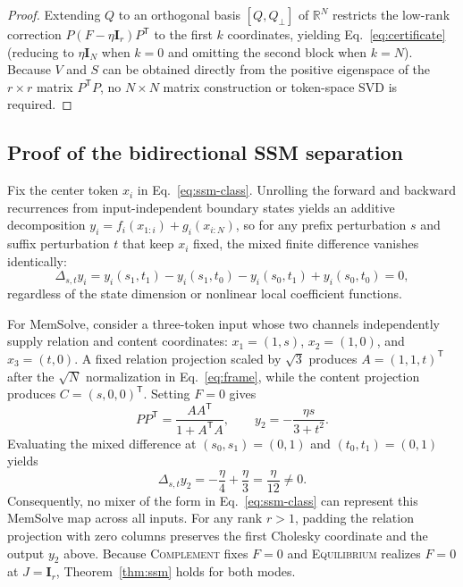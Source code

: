 \documentclass[10pt,twocolumn]{article}
\newcommand{\R}{\mathbb{R}}
\newcommand{\I}{\mathbf{I}}
\newcommand{\T}{\mathsf{T}}
\begin{document}
\begin{proof}
Extending $Q$ to an orthogonal basis $[Q,Q_\perp]$ of $\R^N$ restricts the
low-rank correction $P(F-\eta\I_r)P^\T$ to the first $k$ coordinates,
yielding Eq.~\eqref{eq:certificate} (reducing to $\eta\I_N$ when $k=0$ and
omitting the second block when $k=N$).
Because $V$ and $S$ can be obtained directly from the positive eigenspace of
the $r\times r$ matrix $P^\T P$, no $N\times N$ matrix construction or
token-space SVD is required.
\end{proof}

\subsection{Proof of the bidirectional SSM separation}
\label{app:ssm}

Fix the center token $x_i$ in Eq.~\eqref{eq:ssm-class}. Unrolling the forward
and backward recurrences from input-independent boundary states yields an
additive decomposition $y_i=f_i(x_{1:i})+g_i(x_{i:N})$, so for any prefix
perturbation $s$ and suffix perturbation $t$ that keep $x_i$ fixed, the mixed
finite difference vanishes identically:
\begin{equation}
 \Delta_{s,t}y_i
 =y_i(s_1,t_1)-y_i(s_1,t_0)-y_i(s_0,t_1)+y_i(s_0,t_0)=0,
 \label{eq:mixed-difference}
\end{equation}
regardless of the state dimension or nonlinear local coefficient functions.

For MemSolve, consider a three-token input whose two channels independently
supply relation and content coordinates: $x_1=(1,s)$, $x_2=(1,0)$, and
$x_3=(t,0)$.
A fixed relation projection scaled by $\sqrt3$ produces $A=(1,1,t)^\T$ after
the $\sqrt N$ normalization in Eq.~\eqref{eq:frame}, while the content
projection produces $C=(s,0,0)^\T$.
Setting $F=0$ gives
\begin{equation}
 PP^\T=\frac{AA^\T}{1+A^\T A},\qquad
 y_2=-\frac{\eta s}{3+t^2}.
\end{equation}
Evaluating the mixed difference at $(s_0,s_1)=(0,1)$ and $(t_0,t_1)=(0,1)$
yields
\begin{equation}
 \Delta_{s,t}y_2=-\frac{\eta}{4}+\frac{\eta}{3}
 =\frac{\eta}{12}\ne0.
\end{equation}
Consequently, no mixer of the form in Eq.~\eqref{eq:ssm-class} can represent
this MemSolve map across all inputs. For any rank $r>1$, padding the relation
projection with zero columns preserves the first Cholesky coordinate and the
output $y_2$ above.
Because \textsc{Complement} fixes $F=0$ and \textsc{Equilibrium} realizes
$F=0$ at $J=\I_r$, Theorem~\ref{thm:ssm} holds for both modes.
\end{document}
